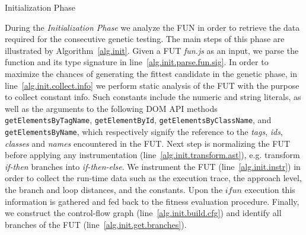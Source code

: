 \documentclass[sigconf,review, anonymous]{acmart}
\begin{document}
\begin{algorithm}[t!]
  \caption{Initialization Phase}
  \label{alg.init}
  \scriptsize
  \DontPrintSemicolon
  \SetAlgoVlined
\end{algorithm}

During the \emph{Initialization Phase} we analyze the FUN in order to retrieve the data required for the consecutive genetic testing. The main steps of this phase are illustrated by Algorithm~\ref{alg.init}. Given a FUT \emph{fun.js} as an input, we parse the function and its type signature in line~\ref{alg.init.parse.fun.sig}. In order to maximize the chances of generating the fittest candidate in the genetic phase, in line~\ref{alg.init.collect.info} we perform static analysis of the FUT with the purpose to collect constant info. Such constants include the numeric and string literals, as well as the arguments to the following DOM API methods \texttt{getElementsByTagName}, \texttt{getElementById}, \texttt{getElementsByClassName}, and \texttt{getElementsByName},
which respectively signify the reference to the \emph{tags}, \emph{ids}, \emph{classes} and \emph{names} encountered in the FUT. Next step is normalizing the FUT before applying any instrumentation (line~\ref{alg.init.transform.ast}), e.g. transform \emph{if-then} branches into \emph{if-then-else}. We instrument the FUT (line~\ref{alg.init.instr}) in order to collect the run-time data such as the execution trace, the approach level, the branch and loop distances, and the constants. Upon the $ifun$ execution this information is gathered and fed back to the fitness evaluation procedure. Finally, we construct the control-flow graph (line~\ref{alg.init.build.cfg}) and identify all branches of the FUT (line~\ref{alg.init.get.branches}).
\end{document}

